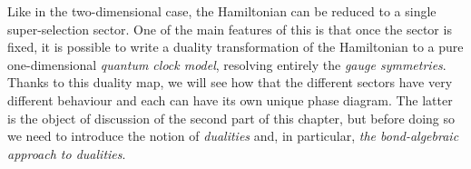 \begin{figure}[t]
\end{figure}


Like in the two-dimensional case, the Hamiltonian can be reduced to a single super-selection sector.
One of the main features of this is that once the sector is fixed, it is possible to write a duality transformation of the  Hamiltonian to a pure one-dimensional \emph{quantum clock model}, resolving entirely the \emph{gauge symmetries}.
Thanks to this duality map, we will see how that the different sectors have very different behaviour and each can have its own unique phase diagram.
The latter is the object of discussion of the second part of this chapter, but before doing so we need to introduce the notion of \emph{dualities} and, in particular, \emph{the bond-algebraic approach to dualities}.
